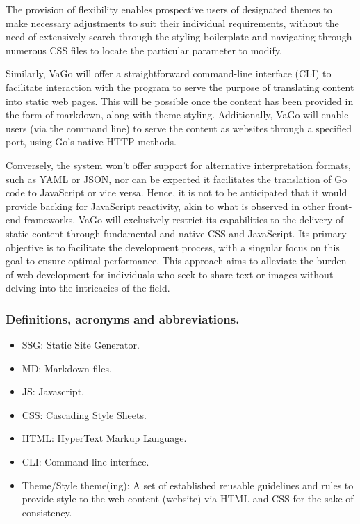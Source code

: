 The provision of flexibility enables prospective users of designated
themes to make necessary adjustments to suit their individual
requirements, without the need of extensively search through the styling
boilerplate and navigating through numerous CSS files to locate the
particular parameter to modify.

Similarly, VaGo will offer a straightforward command-line interface
(CLI) to facilitate interaction with the program to serve the purpose of
translating content into static web pages. This will be possible once
the content has been provided in the form of markdown, along with theme
styling. Additionally, VaGo will enable users (via the command line) to
serve the content as websites through a specified port, using Go's
native HTTP methods.

Conversely, the system won't offer support for alternative
interpretation formats, such as YAML or JSON, nor can be expected it
facilitates the translation of Go code to JavaScript or vice versa.
Hence, it is not to be anticipated that it would provide backing for
JavaScript reactivity, akin to what is observed in other front-end
frameworks. VaGo will exclusively restrict its capabilities to the
delivery of static content through fundamental and native CSS and
JavaScript. Its primary objective is to facilitate the development
process, with a singular focus on this goal to ensure optimal
performance. This approach aims to alleviate the burden of web
development for individuals who seek to share text or images without
delving into the intricacies of the field.

\subsubsection{Definitions, acronyms and
abbreviations.}\label{subsubsec:definitions-acronyms-and-abbreviations.}

\begin{itemize}
    \item
    SSG: Static Site Generator.
    \item
    MD: Markdown files.
    \item
    JS: Javascript.
    \item
    CSS: Cascading Style Sheets.
    \item
    HTML: HyperText Markup Language.
    \item
    CLI: Command-line interface.
    \item
    Theme/Style theme(ing): A set of established reusable guidelines and
    rules to provide style to the web content (website) via HTML and CSS
    for the sake of consistency.
\end{itemize}


